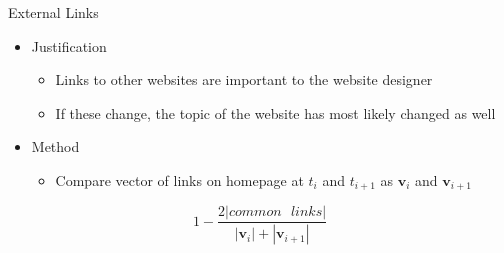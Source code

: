 \documentclass[10pt]{beamer}
\begin{document}
\begin{frame}{External Links}

\Large
\begin{itemize}
\item Justification
\begin{itemize}
\large\item Links to other websites are important to the website designer
\item If these change, the topic of the website has most likely changed as well
\end{itemize}
\item Method
\begin{itemize}
\large\item Compare vector of links on homepage at $t_i$ and $t_{i+1}$ as $\textbf{v}_i$ and $\textbf{v}_{i+1}$
\end{itemize}
\end{itemize}

\begin{equation*}
1 - \frac{2|common \text{ } links|}{|\textbf{v}_i| + |\textbf{v}_{i+1}|}
\end{equation*}

\end{frame}
\end{document}
